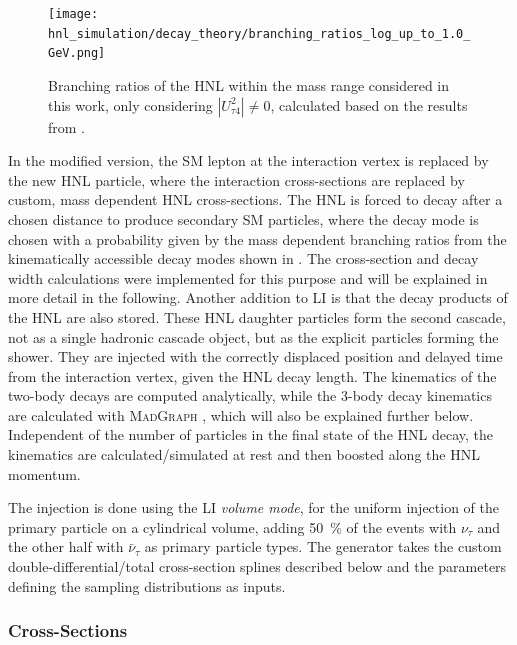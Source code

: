 \begin{figure}[h]
    \texttt{[image: hnl\_simulation/decay\_theory/branching\_ratios\_log\_up\_to\_1.0\_GeV.png]}
    \caption[HNL branching ratios]{Branching ratios of the HNL within the mass range considered in this work, only considering $|U_{\tau4}^2| \neq 0$, calculated based on the results from \cite{Coloma:2020lgy}.}
\end{figure}

In the modified version, the SM lepton at the interaction vertex is replaced by the new HNL particle, where the interaction cross-sections are replaced by custom, mass dependent HNL cross-sections. The HNL is forced to decay after a chosen distance to produce secondary SM particles, where the decay mode is chosen with a probability given by the mass dependent branching ratios from the kinematically accessible decay modes shown in . The cross-section and decay width calculations were implemented for this purpose and will be explained in more detail in the following. Another addition to LI is that the decay products of the HNL are also stored. These HNL daughter particles form the second cascade, not as a single hadronic cascade object, but as the explicit particles forming the shower. They are injected with the correctly displaced position and delayed time from the interaction vertex, given the HNL decay length. The kinematics of the two-body decays are computed analytically, while the 3-body decay kinematics are calculated with \textsc{MadGraph} , which will also be explained further below. Independent of the number of particles in the final state of the HNL decay, the kinematics are calculated/simulated at rest and then boosted along the HNL momentum. 

The injection is done using the LI \textit{volume mode}, for the uniform injection of the primary particle on a cylindrical volume, adding \SI{50}{\percent} of the events with $\nu_\tau$ and the other half with $\bar{\nu}_\tau$ as primary particle types. The generator takes the custom double-differential/total cross-section splines described below and the parameters defining the sampling distributions as inputs.


\subsubsection{Cross-Sections}

